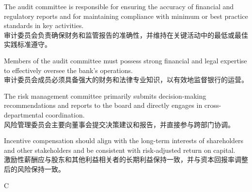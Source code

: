 \documentclass{article}
\begin{document}
\begin{choices}
    \item The audit committee is responsible for ensuring the accuracy of financial and regulatory reports and for maintaining compliance with minimum or best practice standards in key activities.\\
    审计委员会负责确保财务和监管报告的准确性，并维持在关键活动中的最低或最佳实践标准遵守。
    
    \item Members of the audit committee must possess strong financial and legal expertise to effectively oversee the bank's operations.\\
    审计委员会成员必须具备强大的财务和法律专业知识，以有效地监督银行的运营。
    
    \item The risk management committee primarily submits decision-making recommendations and reports to the board and directly engages in cross-departmental coordination.\\
    风险管理委员会主要向董事会提交决策建议和报告，并直接参与跨部门协调。
    
    \item Incentive compensation should align with the long-term interests of shareholders and other stakeholders and be consistent with risk-adjusted return on capital.\\
    激励性薪酬应与股东和其他利益相关者的长期利益保持一致，并与资本回报率调整后的风险保持一致。
\end{choices}


\begin{correctanswer}
    C
\end{correctanswer}
\end{document}
